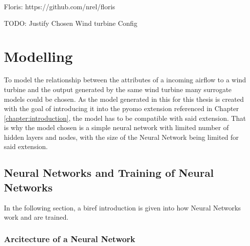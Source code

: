 Floris:
https://github.com/nrel/floris


TODO: Justify Chosen Wind turbine Config


\section{Modelling}

To model the relationship between the attributes of a incoming airflow to a wind turbine and the output generated by the same wind turbine many surrogate models could be chosen. As the model generated in this for this thesis is created with the goal of introducing it into the pyomo extension referenced in Chapter \ref{chapter:introduction}, the model has to be compatible with said extension. That is why the model chosen is a simple neural network with limited number of hidden layers and nodes, with the size of the Neural Network being limited for said extension. 

\subsection{Neural Networks and Training of  Neural Networks}

In the following section, a biref introduction is given into how Neural Networks work and are trained.  

\subsubsection{Arcitecture of a Neural Network}

